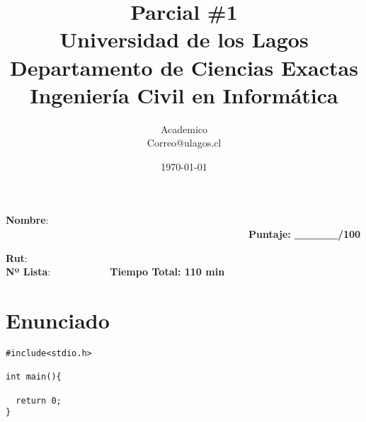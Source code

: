 \documentclass[letter,10pt]{article}
\begin{document}
\title{\vspace{-2cm}\textbf{Parcial \#1}\\
\normalsize{Universidad de los Lagos}\\
\normalsize{Departamento de Ciencias Exactas}\\
\normalsize{Ingeniería Civil en Informática}\vspace{-3mm}} 

\author {Academico\\Correo@ulagos.cl\vspace{-3mm}}
\date{\today} 

\maketitle
\vspace{-0.6cm}
\textbf{Nombre}:~~~~~~~~~~~~~~~~~~~~~~~~~~~~~~~~~~~~~~~~~~~~~~~~~~~~~~~~~~~~~~~~~~~~~~~~~~~~~~~~~~~~~~~~~~~~~~~~~~~~~~~~~~~~~~~~\textbf{Puntaje: \_\_\_\_\_/100}
\vspace{-0.4cm}
\begin{multicols}{2}
\textbf{Rut}:\\           

\textbf{Nº Lista}:~~~~~~~~~~~~\textbf{Tiempo Total: 110 min}
\end{multicols}\vspace{-1.2cm}


\section{Enunciado}

\blindtext %

\begin{lstlisting}
#include<stdio.h>

int main(){

  return 0;
}
\end{lstlisting}
\end{document}
